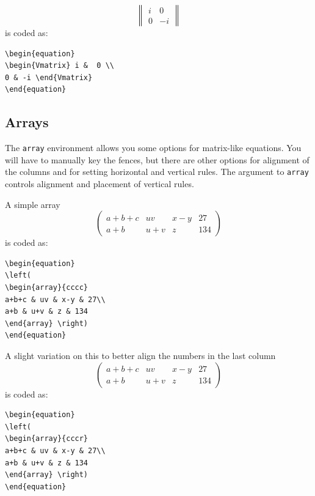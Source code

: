 \documentclass[lettersize,journal]{IEEEtran}
\begin{document}
\begin{equation}
\begin{Vmatrix} i &  0 \\ 
0 & -i \end{Vmatrix}
\end{equation}
is coded as:
\begin{verbatim}
\begin{equation}
\begin{Vmatrix} i &  0 \\ 
0 & -i \end{Vmatrix}
\end{equation}\end{verbatim}

\subsection{Arrays}
The {\tt{array}} environment allows you some options for matrix-like equations. You will have to manually key the fences, but there are other options for alignment of the columns and for setting horizontal and vertical rules. The argument to {\tt{array}} controls alignment and placement of vertical rules.

A simple array
\begin{equation}
\left(
\begin{array}{cccc}
a+b+c & uv & x-y & 27\\
a+b & u+v & z & 134
\end{array}\right)
\end{equation}
is coded as:
\begin{verbatim}
\begin{equation}
\left(
\begin{array}{cccc}
a+b+c & uv & x-y & 27\\
a+b & u+v & z & 134
\end{array} \right)
\end{equation}
\end{verbatim}

A slight variation on this to better align the numbers in the last column
\begin{equation}
\left(
\begin{array}{cccr}
a+b+c & uv & x-y & 27\\
a+b & u+v & z & 134
\end{array}\right)
\end{equation}
is coded as:
\begin{verbatim}
\begin{equation}
\left(
\begin{array}{cccr}
a+b+c & uv & x-y & 27\\
a+b & u+v & z & 134
\end{array} \right)
\end{equation}
\end{verbatim}
\end{document}
